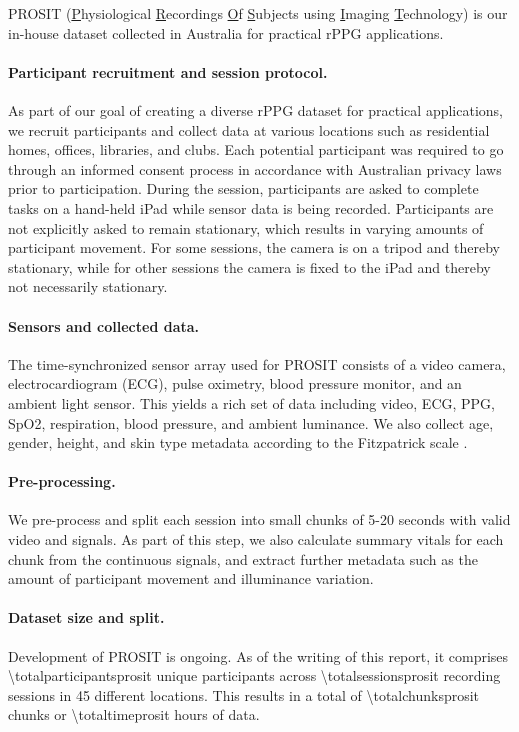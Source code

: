 \documentclass{article}
\begin{document}
PROSIT (\underline{P}hysiological \underline{R}ecordings \underline{O}f \underline{S}ubjects using \underline{I}maging \underline{T}echnology) is our in-house dataset collected in Australia for practical rPPG applications.

\paragraph{Participant recruitment and session protocol.} 
As part of our goal of creating a diverse rPPG dataset for practical applications, we recruit participants and collect data at various locations such as residential homes, offices, libraries, and clubs.
Each potential participant was required to go through an informed consent process in accordance with Australian privacy laws prior to participation.
During the session, participants are asked to complete tasks on a hand-held iPad while sensor data is being recorded.
Participants are not explicitly asked to remain stationary, which results in varying amounts of participant movement.
For some sessions, the camera is on a tripod and thereby stationary, while for other sessions the camera is fixed to the iPad and thereby not necessarily stationary.

\paragraph{Sensors and collected data.}
The time-synchronized sensor array used for PROSIT consists of a video camera, electrocardiogram (ECG), pulse oximetry, blood pressure monitor, and an ambient light sensor.
This yields a rich set of data including video, ECG, PPG, SpO2, respiration, blood pressure, and ambient luminance.
We also collect age, gender, height, and skin type metadata according to the Fitzpatrick scale \cite{fitzpatrick1975soleil}.

\paragraph{Pre-processing.}
We pre-process and split each session into small chunks of 5-20 seconds with valid video and signals.
As part of this step, we also calculate summary vitals for each chunk from the continuous signals, and extract further metadata such as the amount of participant movement and illuminance variation.

\paragraph{Dataset size and split.}
Development of PROSIT is ongoing.
As of the writing of this report, it comprises \num{\totalparticipantsprosit} unique participants across \num{\totalsessionsprosit} recording sessions in 45 different locations.
This results in a total of \num{\totalchunksprosit} chunks or \num{\totaltimeprosit} hours of data.
\end{document}
